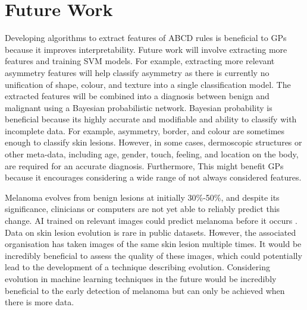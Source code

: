 \chapter{Future Work}
Developing algorithms to extract features of ABCD rules is beneficial to GPs because it improves interpretability. Future work will involve extracting more features and training SVM models. For example, extracting more relevant asymmetry features will help classify asymmetry as there is currently no unification of shape, colour, and texture into a single classification model. The extracted features will be combined into a diagnosis between benign and malignant using a Bayesian probabilistic network. Bayesian probability is beneficial because its highly accurate \cite{Takruri2017} and modifiable and ability to classify with incomplete data. For example, asymmetry, border, and colour are sometimes enough to classify skin lesions. However, in some cases, dermoscopic structures or other meta-data, including age, gender, touch, feeling, and location on the body, are required for an accurate diagnosis. Furthermore, This might benefit GPs because it encourages considering a wide range of not always considered features.

Melanoma evolves from benign lesions at initially 30\%-50\%, and despite its significance, clinicians or computers are not yet able to reliably predict this change. AI trained on relevant images could predict melanoma before it occurs \cite{Sondermann2019}. Data on skin lesion evolution is rare in public datasets. However, the associated organisation has taken images of the same skin lesion multiple times. It would be incredibly beneficial to assess the quality of these images, which could potentially lead to the development of a technique describing evolution. Considering evolution in machine learning techniques in the future would be incredibly beneficial to the early detection of melanoma but can only be achieved when there is more data.